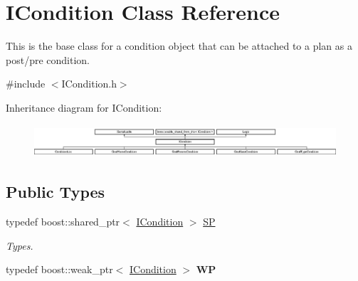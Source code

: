 \hypertarget{class_i_condition}{}\section{I\+Condition Class Reference}
\label{class_i_condition}


This is the base class for a condition object that can be attached to a plan as a post/pre condition.  




{\ttfamily \#include $<$I\+Condition.\+h$>$}

Inheritance diagram for I\+Condition\+:\begin{figure}[H]
\begin{center}
\leavevmode
\includegraphics[height=1.208633cm]{class_i_condition}
\end{center}
\end{figure}
\subsection*{Public Types}
\begin{DoxyCompactItemize}
\item 
\mbox{\label{class_i_condition_a9e52c5b905c336e61daf97bc3f10def8}} 
typedef boost\+::shared\+\_\+ptr$<$ \hyperlink{class_i_condition}{I\+Condition} $>$ \hyperlink{class_i_condition_a9e52c5b905c336e61daf97bc3f10def8}{SP}
\begin{DoxyCompactList}\small\item\em Types. \end{DoxyCompactList}\item 
\mbox{\label{class_i_condition_a4d7729ffec52c82c854c2971d457c076}} 
typedef boost\+::weak\+\_\+ptr$<$ \hyperlink{class_i_condition}{I\+Condition} $>$ {\bfseries WP}
\end{DoxyCompactItemize}
